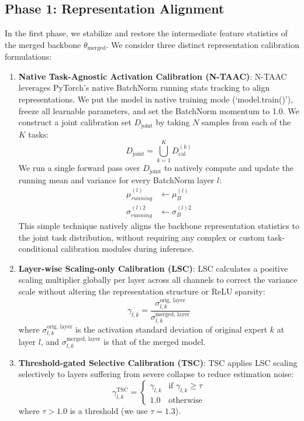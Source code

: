 \documentclass{article}
\theoremstyle{plain}
\theoremstyle{definition}
\theoremstyle{remark}
\begin{document}
\subsection{Phase 1: Representation Alignment}
In the first phase, we stabilize and restore the intermediate feature statistics of the merged backbone $\theta_{\text{merged}}$. We consider three distinct representation calibration formulations:
\begin{enumerate}
    \item \textbf{Native Task-Agnostic Activation Calibration (N-TAAC)}:
    N-TAAC leverages PyTorch's native BatchNorm running stats tracking to align representations. We put the model in native training mode (`model.train()'), freeze all learnable parameters, and set the BatchNorm momentum to 1.0. We construct a joint calibration set $D_{\text{joint}}$ by taking $N$ samples from each of the $K$ tasks:
    \begin{equation}
        D_{\text{joint}} = \bigcup_{k=1}^K D_{\text{cal}}^{(k)}
    \end{equation}
    We run a single forward pass over $D_{\text{joint}}$ to natively compute and update the running mean and variance for every BatchNorm layer $l$:
    \begin{align}
        \mu_{running}^{(l)} & \leftarrow \mu_B^{(l)} \\
        \sigma_{running}^{(l)2} & \leftarrow \sigma_B^{(l)2}
    \end{align}
    This simple technique natively aligns the backbone representation statistics to the joint task distribution, without requiring any complex or custom task-conditional calibration modules during inference.
    \item \textbf{Layer-wise Scaling-only Calibration (LSC)}:
    LSC calculates a positive scaling multiplier globally per layer across all channels to correct the variance scale without altering the representation structure or ReLU sparsity:
    \begin{equation}
        \gamma_{l,k} = \frac{\sigma_{l,k}^{\text{orig, layer}}}{\sigma_{l,k}^{\text{merged, layer}}}
    \end{equation}
    where $\sigma_{l,k}^{\text{orig, layer}}$ is the activation standard deviation of original expert $k$ at layer $l$, and $\sigma_{l,k}^{\text{merged, layer}}$ is that of the merged model.
    \item \textbf{Threshold-gated Selective Calibration (TSC)}:
    TSC applies LSC scaling selectively to layers suffering from severe collapse to reduce estimation noise:
    \begin{equation}
        \gamma_{l,k}^{\text{TSC}} = \begin{cases}
            \gamma_{l,k} & \text{if } \gamma_{l,k} \ge \tau \\
            1.0 & \text{otherwise}
        \end{cases}
    \end{equation}
    where $\tau > 1.0$ is a threshold (we use $\tau = 1.3$).
\end{enumerate}
\end{document}
